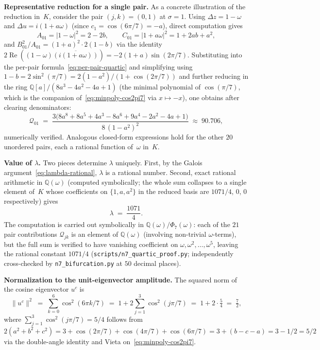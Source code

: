 \textbf{Representative reduction for a single pair.}
As a concrete illustration of the reduction in~$K$,
consider the pair $(j, k) = (0, 1)$ at $\sigma = 1$.
Using $\Delta z = 1 - \omega$ and $\Delta u = i(1 + a\omega)$
(since $c_1 = \cos(6\pi/7) = -a$), direct computation gives
\[
  A_{01} = |1 - \omega|^2 = 2 - 2b,
  \qquad
  C_{01} = |1 + a\omega|^2 = 1 + 2ab + a^2,
\]
and $B_{01}^2/A_{01} = (1+a)^2 \cdot 2(1-b)$ via the identity
$2\operatorname{Re}((1-\omega)\overline{(i(1+a\omega))})
= -2(1+a)\sin(2\pi/7)$.  Substituting into the per-pair
formula~\eqref{eq:per-pair-quartic} and simplifying using
$1 - b = 2\sin^2(\pi/7) = 2(1 - a^2)/(1+\cos(2\pi/7))$ and
further reducing in the ring $\mathbb{Q}[a]/(8a^3 - 4a^2
- 4a + 1)$ (the minimal polynomial of $\cos(\pi/7)$,
which is the companion of~\eqref{eq:minpoly-cos2pi7}
via $x \mapsto -x$), one obtains after clearing denominators:
\begin{equation}\label{eq:Q01-reduced}
  \mathcal{Q}_{01}
  \;=\; \frac{3\bigl(8a^8 + 8a^5 + 4a^3 - 8a^6 +
    9a^4 - 2a^2 - 4a + 1\bigr)}
    {8\,(1 - a^2)^2}
  \;\approx\; 90.706,
\end{equation}
numerically verified.  Analogous closed-form expressions hold
for the other $20$ unordered pairs, each a rational function
of~$\omega$ in~$K$.

\textbf{Value of $\lambda$.}
Two pieces determine $\lambda$ uniquely.  First, by the Galois
argument~\eqref{eq:lambda-rational}, $\lambda$ is a rational
number.  Second, exact rational arithmetic in
$\mathbb{Q}(\omega)$ (computed symbolically; the whole sum
collapses to a single element of~$K$ whose coefficients on
$\{1, a, a^2\}$ in the reduced basis are
$1071/4$, $0$, $0$ respectively) gives
\begin{equation}\label{eq:lambda-1071}
  \lambda \;=\; \frac{1071}{4}.
\end{equation}
The computation is carried out symbolically in
$\mathbb{Q}(\omega)/\Phi_7(\omega)$: each of the $21$ pair
contributions $\mathcal{Q}_{jk}$ is an element of
$\mathbb{Q}(\omega)$ (involving non-trivial $\omega$-terms),
but the full sum is verified to have vanishing coefficient
on $\omega, \omega^2, \ldots, \omega^5$, leaving the rational
constant $1071/4$
(\texttt{scripts/n7\_quartic\_proof.py}; independently
cross-checked by \texttt{n7\_bifurcation.py} at $50$ decimal
places).

\textbf{Normalization to the unit-eigenvector amplitude.}
The squared norm of the cosine eigenvector $u^c$ is
\begin{equation}\label{eq:uc-norm}
  \|u^c\|^2
  \;=\; \sum_{k=0}^{6} \cos^2(6\pi k/7)
  \;=\; 1 + 2\sum_{j=1}^{3}\cos^2(j\pi/7)
  \;=\; 1 + 2 \cdot \tfrac{5}{4}
  \;=\; \tfrac{7}{2},
\end{equation}
where $\sum_{j=1}^{3}\cos^2(j\pi/7) = 5/4$ follows from
$2(a^2 + b^2 + c^2) = 3 + \cos(2\pi/7) + \cos(4\pi/7) +
\cos(6\pi/7) = 3 + (b - c - a) = 3 - 1/2 = 5/2$ via the
double-angle identity and Vieta on~\eqref{eq:minpoly-cos2pi7}.

